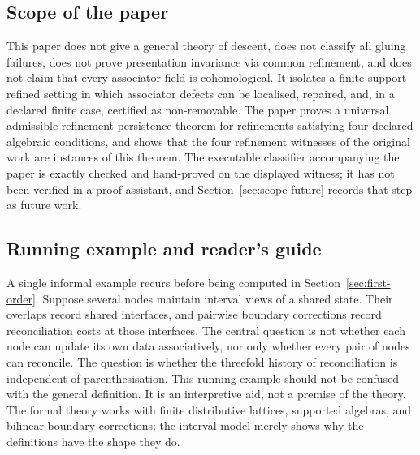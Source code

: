 \documentclass[11pt]{article}
\begin{document}
\subsection{Scope of the paper}

This paper does not give a general theory of descent, does not classify all gluing failures, does not prove presentation invariance via common refinement, and does not claim that every associator field is cohomological. It isolates a finite support-refined setting in which associator defects can be localised, repaired, and, in a declared finite case, certified as non-removable. The paper proves a universal admissible-refinement persistence theorem for refinements satisfying four declared algebraic conditions, and shows that the four refinement witnesses of the original work are instances of this theorem. The executable classifier accompanying the paper is exactly checked and hand-proved on the displayed witness; it has not been verified in a proof assistant, and Section~\ref{sec:scope-future} records that step as future work.

\subsection{Running example and reader's guide}

A single informal example recurs before being computed in Section~\ref{sec:first-order}. Suppose several nodes maintain interval views of a shared state. Their overlaps record shared interfaces, and pairwise boundary corrections record reconciliation costs at those interfaces. The central question is not whether each node can update its own data associatively, nor only whether every pair of nodes can reconcile. The question is whether the threefold history of reconciliation is independent of parenthesisation. This running example should not be confused with the general definition. It is an interpretive aid, not a premise of the theory. The formal theory works with finite distributive lattices, supported algebras, and bilinear boundary corrections; the interval model merely shows why the definitions have the shape they do.
\end{document}
